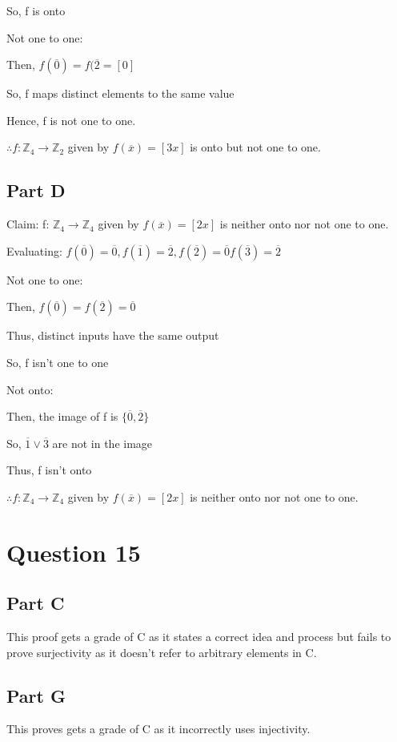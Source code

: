 \documentclass{article}
\begin{document}
So,  f is onto

Not one to one:

Then, $f(\overline{0})=f(\overline{2}=[0]$

So, f maps distinct elements to the same value

Hence, f is not one to one.

$\therefore f: \mathbb{Z}_4 \rightarrow \mathbb{Z}_2$ given by $f(\overline{x})=[3x]$ is onto but not one to one.

\subsection*{Part D}
Claim: f: $\mathbb{Z}_4 \rightarrow \mathbb{Z}_4$ given by $f(\overline{x})=[2x]$ is neither onto nor not one to one.

Evaluating:
$f(\overline{0})=\overline{0}, f(\overline{1})=\overline{2}, f(\overline{2})=\overline{0} f(\overline{3})=\overline{2}$

Not one to one:

Then, $f(\overline{0})=f(\overline{2})=\overline{0}$

Thus, distinct inputs have the same output

So, f isn't one to one

Not onto:

Then, the image of f is $\{\overline{0},\overline{2}\}$ 

So, $\overline{1} \vee \overline{3}$ are not in the image

Thus, f isn't onto

$\therefore f: \mathbb{Z}_4 \rightarrow \mathbb{Z}_4$ given by $f(\overline{x})=[2x]$ is neither onto nor not one to one.

\section*{Question 15}
\subsection*{Part C}

This proof gets a grade of C as it states a correct idea and process but fails to prove surjectivity as it doesn't refer to arbitrary elements in C.

\subsection*{Part G}

This proves gets a grade of C as it incorrectly uses injectivity.
\end{document}
